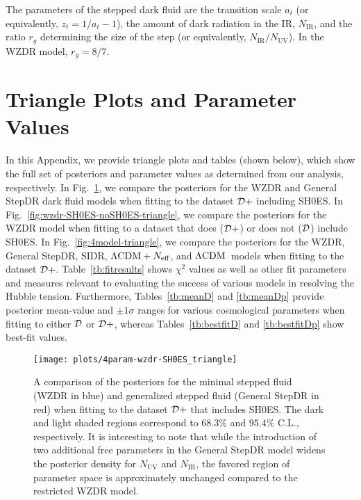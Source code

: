 \documentclass[aps,prd,twocolumn,nofootinbib,superscriptaddress]{revtex4}
\newcommand{\D}{\cal{D}}
\newcommand{\Fig}[1]{Fig.~\ref{fig:#1}}
\newcommand{\Tab}[1]{Table~\ref{tb:#1}}
\newcommand{\nir}{N_\text{IR}}
\newcommand{\nuv}{N_\text{UV}}
\def\lcdm{$\Lambda{\rm CDM}$}
\newcommand{\Neff}{N_{\rm eff}}
\begin{document}
The parameters of the stepped dark fluid are the transition scale $a_t$ (or equivalently, $z_t = 1 / a_t - 1$), the amount of dark radiation in the IR, $\nir$, and the ratio $r_g$ determining the size of the step (or equivalently, $\nir/\nuv$).  In the WZDR model, $r_g=8/7$.



\onecolumngrid
\section{Triangle Plots and Parameter Values}
\label{app:triangles}

In this Appendix, we provide triangle plots and tables (shown below), which show the full set of posteriors and parameter values as determined from our analysis, respectively. In \Fig{wzdr-4param-triangle}, we compare the posteriors for the WZDR and General StepDR dark fluid models when fitting to the dataset $\D+$ including SH0ES. In \Fig{wzdr-SH0ES-noSH0ES-triangle}, we compare the posteriors for the WZDR model when fitting to a dataset that does ($\D+$) or does not ($\D$) include SH0ES. In \Fig{4model-triangle}, we compare the posteriors for the WZDR, General StepDR, SIDR, $\Lambda \text{CDM} + \Neff$, and \lcdm\ models when fitting to the dataset $\D+$. \Tab{fitresults} shows $\chi^2$ values as well as other fit parameters and measures relevant to evaluating the success of various models in resolving the Hubble tension. Furthermore, Tables~\ref{tb:meanD} and \ref{tb:meanDp} provide  posterior mean-value and $\pm 1 \sigma$ ranges for various cosmological parameters when fitting to either $\D$ or $\D+$, whereas Tables~\ref{tb:bestfitD} and \ref{tb:bestfitDp} show best-fit values.


\begin{figure*}[!htbp]
	\centering
	\texttt{[image: plots/4param-wzdr-SH0ES\_triangle]}
	\caption{A comparison of the posteriors for the minimal stepped fluid (WZDR in blue) and generalized stepped fluid (General StepDR in red) when fitting to the dataset $\D+$ that includes SH0ES. The dark and light shaded regions correspond to $68.3\%$ and $95.4\%$ C.L., respectively. It is interesting to note that while the introduction of two additional free parameters in the General StepDR model widens the posterior density for $\nuv$ and $\nir$, the favored region of parameter space is approximately unchanged compared to the restricted WZDR model.}
	\label{fig:wzdr-4param-triangle}
\end{figure*}
\end{document}
